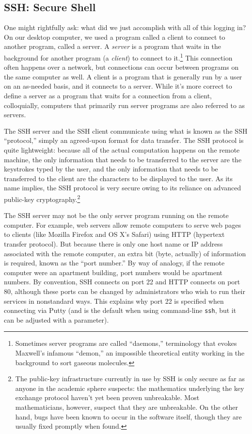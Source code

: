 \documentclass[
]{memoir}
\begin{document}
\hypertarget{ssh-secure-shell}{%
\subsection*{SSH: Secure Shell}\label{ssh-secure-shell}}

One might rightfully ask: what did we just accomplish with all of this logging in? On our desktop computer, we used a program called a client to connect to another program, called a server. A \emph{server} is a program that waits in the background for another program (a \emph{client}) to connect to it.\footnote{Sometimes server programs are called \enquote{daemons,} terminology that evokes Maxwell's infamous \enquote{demon,} an impossible theoretical entity working in the background to sort gaseous molecules.} This connection often happens over a network, but connections can occur between programs on the same computer as well. A client is a program that is generally run by a user on an as-needed basis, and it connects to a server. While it's more correct to define a server as a program that waits for a connection from a client, colloquially, computers that primarily run server programs are also referred to as servers.

The SSH server and the SSH client communicate using what is known as the SSH \enquote{protocol,} simply an agreed-upon format for data transfer. The SSH protocol is quite lightweight: because all of the actual computation happens on the remote machine, the only information that needs to be transferred to the server are the keystrokes typed by the user, and the only information that needs to be transferred to the client are the characters to be displayed to the user. As its name implies, the SSH protocol is very secure owing to its reliance on advanced public-key cryptography.\footnote{The public-key infrastructure currently in use by SSH is only secure as far as anyone in the academic sphere suspects: the mathematics underlying the key exchange protocol haven't yet been proven unbreakable. Most mathematicians, however, suspect that they are unbreakable. On the other hand, bugs have been known to occur in the software itself, though they are usually fixed promptly when found.}

The SSH server may not be the only server program running on the remote computer. For example, web servers allow remote computers to serve web pages to clients (like Mozilla Firefox and OS X's Safari) using HTTP (hypertext transfer protocol). But because there is only one host name or IP address associated with the remote computer, an extra bit (byte, actually) of information is required, known as the \enquote{port number.} By way of analogy, if the remote computer were an apartment building, port numbers would be apartment numbers. By convention, SSH connects on port 22 and HTTP connects on port 80, although these ports can be changed by administrators who wish to run their services in nonstandard ways. This explains why port 22 is specified when connecting via Putty (and is the default when using command-line \texttt{ssh}, but it can be adjusted with a parameter).
\end{document}
